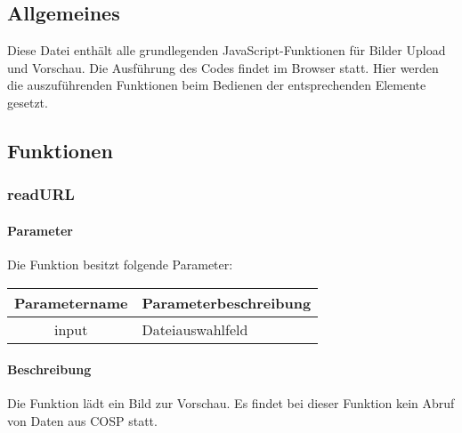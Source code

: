 \subsection{Allgemeines} Diese Datei enthält alle grundlegenden JavaScript-Funktionen für Bilder Upload und Vorschau.
Die Ausführung des Codes findet im Browser statt. Hier werden die auszuführenden Funktionen beim Bedienen der entsprechenden Elemente gesetzt.
\subsection{Funktionen}
\subsubsection{readURL}
\paragraph{Parameter} Die Funktion besitzt folgende Parameter:
\begin{table}[H]
	\begin{tabular}{|c|p{11cm}|}
		\hline
		\textbf{Parametername} & \textbf{Parameterbeschreibung} \\ \hline
		input & Dateiauswahlfeld \\ \hline
	\end{tabular}
\end{table}
\paragraph{Beschreibung} Die Funktion lädt ein Bild zur Vorschau. Es findet bei dieser Funktion kein Abruf von Daten aus {\glqq COSP\grqq} statt.
